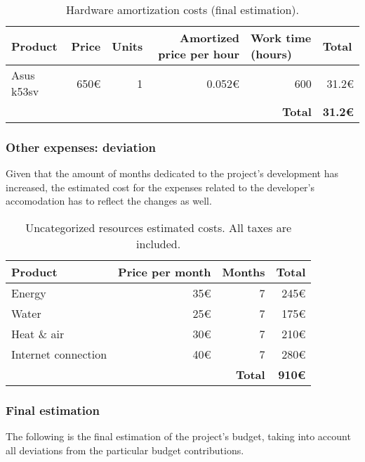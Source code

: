 \begin{table}[h]
	\centering
	\begin{tabular}{l r r r r r}
		\hline
		\textbf{Product} & \multicolumn{1}{l}{\textbf{Price}} & \multicolumn{1}{l}{\textbf{Units}} & \multicolumn{1}{p{3cm}}{\textbf{Amortized price per hour}} & \multicolumn{1}{l}{\textbf{Work time (hours)}} & \multicolumn{1}{l}{\textbf{Total}} \\ \hline
		Asus k53sv & 650€ & 1 & 0.052€ & 600 & 31.2€ \\ \hline
		&  &  &  & \textbf{Total} & \textbf{31.2€}
	\end{tabular}
	\caption{Hardware amortization costs (final estimation).}
	\label{table:hardware-resources-final}
\end{table}

\subsubsection*{Other expenses: deviation}

Given that the amount of months dedicated to the project's development has increased, the estimated cost for the expenses related to the developer's accomodation has to reflect the changes as well.

\begin{table}[h]
	\centering
	\begin{tabular}{lrrr}
		\hline
		\textbf{Product} & \multicolumn{1}{l}{\textbf{Price per month}} & \multicolumn{1}{l}{\textbf{Months}} & \multicolumn{1}{l}{\textbf{Total}} \\ \hline
		Energy & 35€ & 7 & 245€ \\
		Water & 25€ & 7 & 175€ \\
		Heat \& air & 30€ & 7 & 210€ \\
		Internet connection & 40€ & 7 & 280€ \\ \hline
		& \multicolumn{1}{l}{} & \textbf{Total} & \textbf{910€}
	\end{tabular}
	\caption{Uncategorized resources estimated costs. All taxes are included.}
	\label{table:other-resources-final}
\end{table}

\clearpage

\subsubsection*{Final estimation}

The following is the final estimation of the project's budget, taking into account all deviations from the particular budget contributions.

